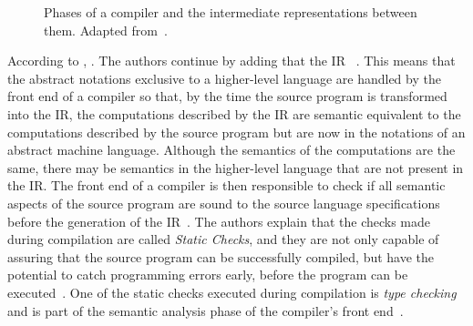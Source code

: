 \documentclass[
    oneside,
    english,
    embeddedlogo,
    noabntexcite
]{ufsc-thesis-rn46-2019}
\begin{document}
\begin{figure}[!ht]
    \caption{Phases of a compiler and the intermediate representations between them. Adapted from~\textcite{Aho:2006:CPT:1177220}.}
\end{figure}

According to \textcite{appel2003modern}, .
The authors continue by adding that the IR ~\cite{appel2003modern}.
This means that the abstract notations exclusive to a higher-level language are handled by the front end of a compiler so that, by the time the source program is transformed into the IR, the computations described by the IR are semantic equivalent to the computations described by the source program but are now in the notations of an abstract machine language.
Although the semantics of the computations are the same, there may be semantics in the higher-level language that are not present in the IR.\@
The front end of a compiler is then responsible to check if all semantic aspects of the source program are sound to the source language specifications before the generation of the IR~\cite{Aho:2006:CPT:1177220}.
The authors explain that the checks made during compilation are called \textit{Static Checks}, and they are not only capable of assuring that the source program can be successfully compiled, but have the potential to catch programming errors early, before the program can be executed~\cite{Aho:2006:CPT:1177220}. One of the static checks executed during compilation is \textit{type checking} and is part of the semantic analysis phase of the compiler's front end~\cite{appel2003modern}.
\end{document}

